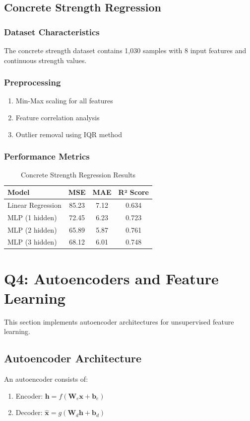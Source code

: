 \documentclass[conference]{IEEEtran}
\begin{document}
\subsection{Concrete Strength Regression}
\subsubsection{Dataset Characteristics}
The concrete strength dataset contains 1,030 samples with 8 input features and continuous strength values.

\subsubsection{Preprocessing}
\begin{enumerate}
    \item Min-Max scaling for all features
    \item Feature correlation analysis
    \item Outlier removal using IQR method
\end{enumerate}

\subsubsection{Performance Metrics}
\begin{table}[h]
\centering
\caption{Concrete Strength Regression Results}
\begin{tabular}{l c c c}
\toprule
Model & MSE & MAE & R² Score \\
\midrule
Linear Regression & 85.23 & 7.12 & 0.634 \\
MLP (1 hidden) & 72.45 & 6.23 & 0.723 \\
MLP (2 hidden) & 65.89 & 5.87 & 0.761 \\
MLP (3 hidden) & 68.12 & 6.01 & 0.748 \\
\bottomrule
\end{tabular}
\label{tab:concrete_results}
\end{table}

\section{Q4: Autoencoders and Feature Learning}\label{sec:q4}
This section implements autoencoder architectures for unsupervised feature learning.

\subsection{Autoencoder Architecture}
An autoencoder consists of:
\begin{enumerate}
    \item Encoder: $\mathbf{h} = f(\mathbf{W}_e \mathbf{x} + \mathbf{b}_e)$
    \item Decoder: $\hat{\mathbf{x}} = g(\mathbf{W}_d \mathbf{h} + \mathbf{b}_d)$
\end{enumerate}
\end{document}
